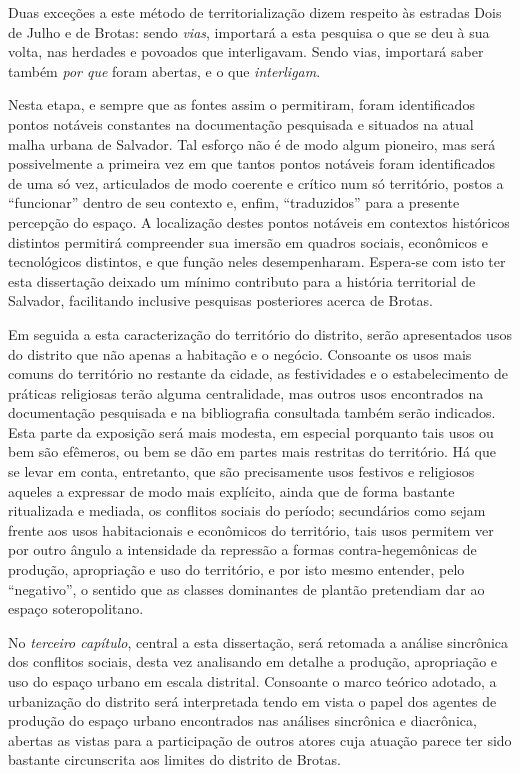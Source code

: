 Duas exceções a este método de territorialização dizem respeito às estradas Dois de Julho e de Brotas: sendo \textit{vias}, importará a esta pesquisa o que se deu à sua volta, nas herdades e povoados que interligavam. Sendo vias, importará saber também \textit{por que} foram abertas, e o que \textit{interligam}.

Nesta etapa, e sempre que as fontes assim o permitiram, foram identificados pontos notáveis constantes na documentação pesquisada e situados na atual malha urbana de Salvador. Tal esforço não é de modo algum pioneiro, mas será possivelmente a primeira vez em que tantos pontos notáveis foram identificados de uma só vez, articulados de modo coerente e crítico num só território, postos a ``funcionar'' dentro de seu contexto e, enfim, ``traduzidos'' para a presente percepção do espaço. A localização destes pontos notáveis em contextos históricos distintos permitirá compreender sua imersão em quadros sociais, econômicos e tecnológicos distintos, e que função neles desempenharam. Espera-se com isto ter esta dissertação deixado um mínimo contributo para a história territorial de Salvador, facilitando inclusive pesquisas posteriores acerca de Brotas. 

Em seguida a esta caracterização do território do distrito, serão apresentados usos do distrito que não apenas a habitação e o negócio. Consoante os usos mais comuns do território no restante da cidade, as festividades e o estabelecimento de práticas religiosas terão alguma centralidade, mas outros usos encontrados na documentação pesquisada e na bibliografia consultada também serão indicados. Esta parte da exposição será mais modesta, em especial porquanto tais usos ou bem são efêmeros, ou bem se dão em partes mais restritas do território. Há que se levar em conta, entretanto, que são precisamente usos festivos e religiosos aqueles a expressar de modo mais explícito, ainda que de forma bastante ritualizada e mediada, os conflitos sociais do período; secundários como sejam frente aos usos habitacionais e econômicos do território, tais usos permitem ver por outro ângulo a intensidade da repressão a formas contra-hegemônicas de produção, apropriação e uso do território, e por isto mesmo entender, pelo ``negativo'', o sentido que as classes dominantes de plantão pretendiam dar ao espaço soteropolitano.

No \textit{terceiro capítulo}, central a esta dissertação, será retomada a análise sincrônica dos conflitos sociais, desta vez analisando em detalhe a produção, apropriação e uso do espaço urbano em escala distrital. Consoante o marco teórico adotado, a urbanização do distrito será interpretada tendo em vista o papel dos agentes de produção do espaço urbano encontrados nas análises sincrônica e diacrônica, abertas as vistas para a participação de outros atores cuja atuação parece ter sido bastante circunscrita aos limites do distrito de Brotas.


